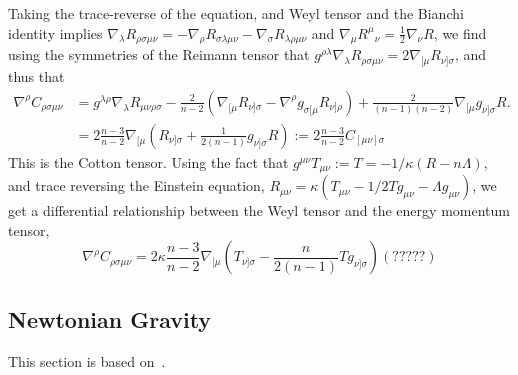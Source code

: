 Taking the trace-reverse of the equation, and Weyl tensor and the Bianchi identity implies $\nabla_{\lambda}R_{\rho \sigma \mu \nu} = - \nabla_{\rho }R_{\sigma \lambda \mu \nu} - \nabla_{\sigma  }R_{\lambda \rho \mu \nu}$ and $\nabla_\mu R^\mu{}_{\nu} = \frac{1}{2}\nabla_\nu R$, we find using the symmetries of the Reimann tensor that $g^{\rho \lambda}\nabla_{\lambda}R_{\rho \sigma \mu \nu}= 2 \nabla_{[\mu} R_{\nu]\sigma} $, and thus that
\begin{align*}
    \nabla^\rho C_{\rho \sigma \mu \nu} 
    & = g^{\lambda \rho}\nabla_\lambda R_{\mu \nu \rho \sigma} - \frac{2}{n - 2} \left(\nabla_{[\mu}R_{\nu]\sigma} - \nabla^\rho g_{\sigma [\mu}R_{\nu]\rho} \right)+ \frac{2 }{(n - 1)(n - 2)} \nabla_{[\mu}g_{\nu]\sigma} R. \\
    & = 2\frac{n - 3}{n - 2} \nabla_{[\mu} \left(R_{\nu]\sigma} + \frac{1}{2(n-1)} g_{\nu] \sigma } R\right) := 2 \frac{n - 3}{n - 2} C_{[\mu \nu] \sigma}
\end{align*}
This is the Cotton tensor. Using the fact that $g^{\mu \nu}T_{\mu \nu} := T = -1/\kappa( R - n \Lambda)$, and trace reversing the Einstein equation, $R_{\mu \nu} = \kappa (T_{\mu \nu} - 1/2 T g_{\mu \nu} - \Lambda g_{\mu \nu})$, we get a differential relationship between the Weyl tensor and the energy momentum tensor, 
\begin{equation*}
    \nabla^\rho C_{\rho \sigma \mu \nu} = 2 \kappa \frac{n - 3}{n - 2} \nabla_{[\mu}\left(T_{\nu] \sigma} - \frac{n}{2(n - 1)} Tg_{\nu] \sigma}\right) (?????)
\end{equation*}



\subsection{Newtonian Gravity}

This section is based on~\autocite{carrollSpacetimeGeometryIntroduction2019}.


